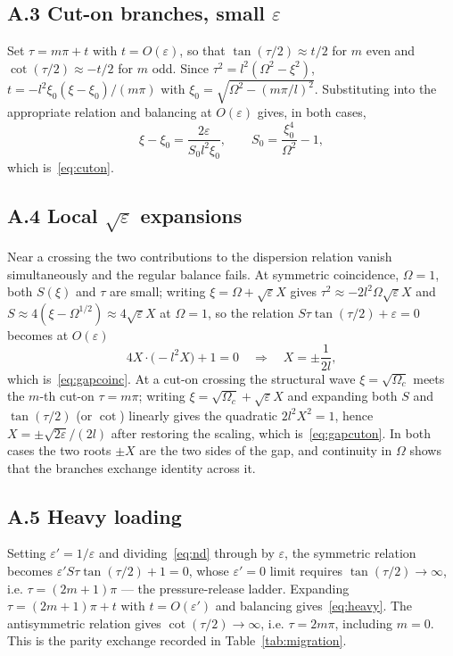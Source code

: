\documentclass[11pt,a4paper]{article}
\newcommand{\Om}{\Omega}
\newcommand{\eps}{\varepsilon}
\theoremstyle{plain}
\theoremstyle{remark}
\begin{document}
\subsection*{A.3 Cut-on branches, small $\eps$}
Set $\tau=m\pi+t$ with $t=O(\eps)$, so that $\tan(\tau/2)\approx t/2$ for $m$ even and
$\cot(\tau/2)\approx-t/2$ for $m$ odd. Since $\tau^2=l^2(\Om^2-\xi^2)$,
$t=-l^2\xi_0(\xi-\xi_0)/(m\pi)$ with $\xi_0=\sqrt{\Om^2-(m\pi/l)^2}$. Substituting into the
appropriate relation and balancing at $O(\eps)$ gives, in both cases,
\begin{equation}
\xi-\xi_0=\frac{2\eps}{S_0l^2\xi_0},\qquad S_0=\frac{\xi_0^4}{\Om^2}-1,
\end{equation}
which is~\eqref{eq:cuton}.

\subsection*{A.4 Local $\sqrt\eps$ expansions}
Near a crossing the two contributions to the dispersion relation vanish simultaneously and the regular
balance fails. At symmetric coincidence, $\Om=1$, both $S(\xi)$ and $\tau$ are small; writing
$\xi=\Om+\sqrt\eps X$ gives $\tau^2\approx-2l^2\Om\sqrt\eps X$ and
$S\approx4(\xi-\Om^{1/2})\approx4\sqrt\eps X$ at $\Om=1$, so the relation
$S\tau\tan(\tau/2)+\eps=0$ becomes at $O(\eps)$
\begin{equation}
4X\cdot\bigl(-l^2 X\bigr)+1=0
\quad\Longrightarrow\quad
X=\pm\frac{1}{2l},
\end{equation}
which is~\eqref{eq:gapcoinc}. At a cut-on crossing the structural wave $\xi=\sqrt{\Om_c}$ meets the
$m$-th cut-on $\tau=m\pi$; writing $\xi=\sqrt{\Om_c}+\sqrt\eps X$ and expanding both $S$ and
$\tan(\tau/2)$ (or $\cot$) linearly gives the quadratic $2l^2X^2=1$, hence
$X=\pm\sqrt{2\eps}/(2l)$ after restoring the scaling, which is~\eqref{eq:gapcuton}. In both cases the
two roots $\pm X$ are the two sides of the gap, and continuity in $\Om$ shows that the branches
exchange identity across it.

\subsection*{A.5 Heavy loading}
Setting $\eps'=1/\eps$ and dividing~\eqref{eq:nd} through by $\eps$, the symmetric relation becomes
$\eps'S\tau\tan(\tau/2)+1=0$, whose $\eps'=0$ limit requires $\tan(\tau/2)\to\infty$, i.e.
$\tau=(2m{+}1)\pi$ --- the pressure-release ladder. Expanding $\tau=(2m{+}1)\pi+t$ with $t=O(\eps')$ and
balancing gives~\eqref{eq:heavy}. The antisymmetric relation gives $\cot(\tau/2)\to\infty$, i.e.
$\tau=2m\pi$, including $m=0$. This is the parity exchange recorded in Table~\ref{tab:migration}.
\end{document}
